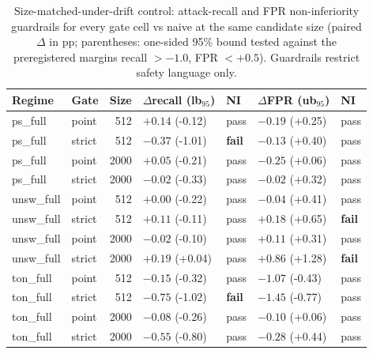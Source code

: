 \begin{table}[t]
\centering
\caption{Size-matched-under-drift control: attack-recall and FPR non-inferiority guardrails
for every gate cell vs naive at the same candidate size (paired $\Delta$ in pp; parentheses:
one-sided 95\% bound tested against the preregistered margins recall $>-1.0$, FPR $<+0.5$).
Guardrails restrict safety language only.}
\label{tab:size_matched_drift_security}
\scriptsize
\begin{tabular}{l l r l l l l}
\toprule
Regime & Gate & Size & $\Delta$recall (lb$_{95}$) & NI & $\Delta$FPR (ub$_{95}$) & NI \\
\midrule
ps\_full & point & 512 & $+0.14$ (-0.12) & pass & $-0.19$ (+0.25) & pass \\
ps\_full & strict & 512 & $-0.37$ (-1.01) & \textbf{fail} & $-0.13$ (+0.40) & pass \\
ps\_full & point & 2000 & $+0.05$ (-0.21) & pass & $-0.25$ (+0.06) & pass \\
ps\_full & strict & 2000 & $-0.02$ (-0.33) & pass & $-0.02$ (+0.32) & pass \\
unsw\_full & point & 512 & $+0.00$ (-0.22) & pass & $-0.04$ (+0.41) & pass \\
unsw\_full & strict & 512 & $+0.11$ (-0.11) & pass & $+0.18$ (+0.65) & \textbf{fail} \\
unsw\_full & point & 2000 & $-0.02$ (-0.10) & pass & $+0.11$ (+0.31) & pass \\
unsw\_full & strict & 2000 & $+0.19$ (+0.04) & pass & $+0.86$ (+1.28) & \textbf{fail} \\
ton\_full & point & 512 & $-0.15$ (-0.32) & pass & $-1.07$ (-0.43) & pass \\
ton\_full & strict & 512 & $-0.75$ (-1.02) & \textbf{fail} & $-1.45$ (-0.77) & pass \\
ton\_full & point & 2000 & $-0.08$ (-0.26) & pass & $-0.10$ (+0.06) & pass \\
ton\_full & strict & 2000 & $-0.55$ (-0.80) & pass & $-0.28$ (+0.44) & pass \\
\bottomrule
\end{tabular}
\end{table}
